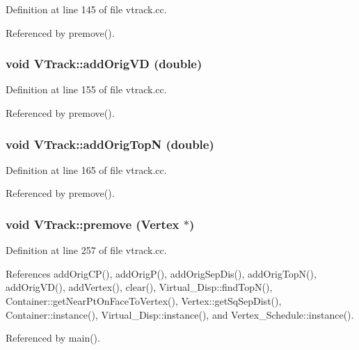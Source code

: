Definition at line 145 of file vtrack.cc.

Referenced by premove().
\subsubsection{\setlength{\rightskip}{0pt plus 5cm}void VTrack::add\-Orig\-VD (double)}\label{classVTrack_8ffc5476e3a6afe96e55746f07055f7c}




Definition at line 155 of file vtrack.cc.

Referenced by premove().
\subsubsection{\setlength{\rightskip}{0pt plus 5cm}void VTrack::add\-Orig\-Top\-N (double)}\label{classVTrack_23f52fb1e7855437ecab15ea7b1dbf4d}




Definition at line 165 of file vtrack.cc.

Referenced by premove().
\subsubsection{\setlength{\rightskip}{0pt plus 5cm}void VTrack::premove ({\bf Vertex} $\ast$)}\label{classVTrack_517d3992d6ab6751876f2697e3ade430}




Definition at line 257 of file vtrack.cc.

References add\-Orig\-CP(), add\-Orig\-P(), add\-Orig\-Sep\-Dis(), add\-Orig\-Top\-N(), add\-Orig\-VD(), add\-Vertex(), clear(), Virtual\_\-Disp::find\-Top\-N(), Container::get\-Near\-Pt\-On\-Face\-To\-Vertex(), Vertex::get\-Sq\-Sep\-Dist(), Container::instance(), Virtual\_\-Disp::instance(), and Vertex\_\-Schedule::instance().

Referenced by main().

